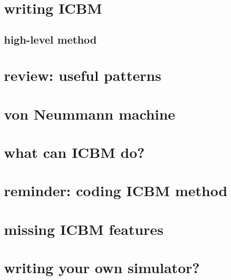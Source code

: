 \section{writing ICBM}

\subsection{high-level method}





\section{review: useful patterns}




\section{von Neummann machine}



\section{what can ICBM do?}




\section{reminder: coding ICBM method}






\section{missing ICBM features}



\section{writing your own simulator?}



